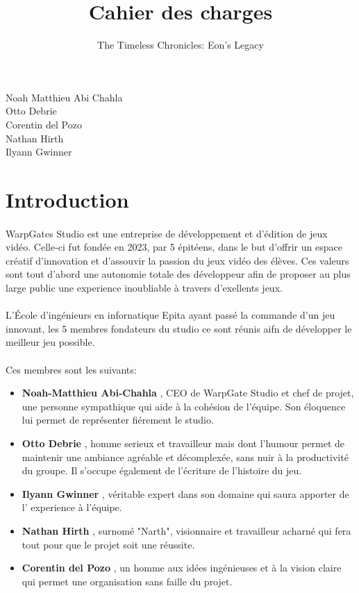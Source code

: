 \documentclass{article}
\title{Cahier des charges}
\author{The Timeless Chronicles: Eon's Legacy}
\date{}
\begin{document}
\large
\maketitle
\begin{center}
    Noah Matthieu Abi Chahla\\
    Otto Debrie\\
    Corentin del Pozo\\
    Nathan Hirth\\
    Ilyann Gwinner\\
\end{center}
\pagebreak
\tableofcontents
\pagebreak

\section{Introduction}
\paragraph{}
WarpGates Studio est une entreprise de d\'eveloppement et d'\'edition de jeux vid\'eo. Celle-ci fut fond\'ee en 2023, par 5 \'epitéens, dans le but d'offrir un espace cr\'eatif d'innovation et d'assouvir la passion du jeux vid\'eo des \'el\`eves. Ces valeurs sont tout d'abord une autonomie totale des d\'eveloppeur afin de proposer au plus large public une experience inoubliable \`a travers d'exellents jeux.

\paragraph{}
L'\'Ecole d'ingénieurs en infornatique Epita ayant pass\'e la commande d'un jeu innovant, les 5 membres fondateurs du studio ce sont r\'eunis aifn de d\'evelopper le meilleur jeu possible.

\paragraph{}
Ces membres sont les suivants:
\begin{itemize}
\item[\textbullet] \textbf{Noah-Matthieu Abi-Chahla} , CEO de WarpGate Studio et chef de projet, une personne sympathique qui aide à la cohésion de l'équipe. Son éloquence lui permet de représenter fiérement le studio.
\item[\textbullet] \textbf{Otto Debrie} , homme serieux et travailleur mais dont l'humour permet de maintenir une ambiance agréable et décomplexée, sans nuir à la productivité du groupe. Il s'occupe également de l'écriture de l'histoire du jeu.
\item[\textbullet] \textbf{Ilyann Gwinner} , véritable expert dans son domaine qui saura apporter de l' experience à l'équipe.
\item[\textbullet] \textbf{Nathan Hirth} , surnomé "Narth", visionnaire et travailleur acharné qui fera tout pour que le projet soit une réussite.
\item[\textbullet] \textbf{Corentin del Pozo} , un homme aux idées ingénieuses et à la vision claire qui permet une organisation sans faille du projet.
\end{itemize}
\end{document}
